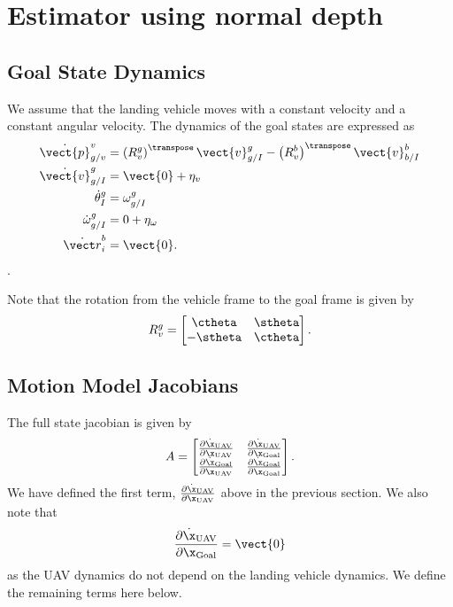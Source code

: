 
\section{Estimator using normal depth}
\subsection{Goal State Dynamics}
We assume that the landing vehicle moves with a constant velocity and a constant
angular velocity. The dynamics of the goal states are expressed as
\begin{align}
  \dot{\vect{p}}_{g/v}^{v} &= \left(R_{v}^{g}\right)^\transpose
  \vect{v}_{g/I}^{g} - \left(R_{v}^{b}\right)^\transpose \vect{v}_{b/I}^{b} \\
  \dot{\vect{v}}_{g/I}^{g} &= \vect{0} + \eta_{v} \\
  \dot{\theta}_{I}^{g} &= \omega_{g/I}^g \\
  \dot{\omega}_{g/I}^{g} &= 0 + \eta_{\omega} \\
  \dot{\vect r}_{i}^{b} &= \vect{0}.
\end{align}.

Note that the rotation from the vehicle frame to the goal frame is given by
\begin{equation}
  R_v^g =
  \begin{bmatrix}
    \ctheta & \stheta \\
    -\stheta & \ctheta
  \end{bmatrix}.
\end{equation}

\subsection{Motion Model Jacobians}
The full state jacobian is given by
\begin{equation}
  A =
  \begin{bmatrix}
    \frac{\partial \dot{\x}_{\text{UAV}}}{\partial \x_{\text{UAV}}} &
    \frac{\partial \dot{\x}_{\text{UAV}}}{\partial \x_{\text{Goal}}} \\
    \frac{\partial \dot{\x}_{\text{Goal}}}{\partial \x_{\text{UAV}}} &
    \frac{\partial \dot{\x}_{\text{Goal}}}{\partial \x_{\text{Goal}}} 
  \end{bmatrix}.
\end{equation}
We have defined the first term, $\frac{\partial \dot{\x}_{\text{UAV}}}{\partial
\x_{\text{UAV}}}$ above in the previous section. We also note that
\begin{equation}
  \frac{\partial \dot{\x}_{\text{UAV}}}{\partial \x_{\text{Goal}}} = \vect{0}
\end{equation}
as the UAV dynamics do not depend on the landing vehicle dynamics. We define the
remaining terms here below.

